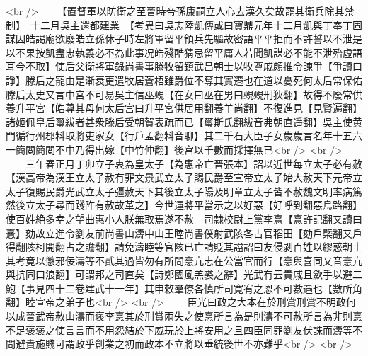 <br />
　　【置督軍以防衛之至晉時帝孫康嗣立人心去漢久矣故罷其衛兵除其禁制】　十二月吳主還都建業　【考異曰吳志陸凱傳或曰寶鼎元年十二月凱與丁奉丁固謀因皓謁廟欲廢皓立孫休子時左將軍留平領兵先驅故密語平平拒而不許誓以不泄是以不果按凱盡忠執義必不為此事况皓殘酷猜忌留平庸人若聞凱謀必不能不泄殆虛語耳今不取】使后父衛將軍錄尚書事滕牧留鎮武昌朝士以牧尊戚頗推令諫爭【爭讀曰諍】滕后之寵由是漸衰更遣牧居蒼梧雖爵位不奪其實遷也在道以憂死何太后常保佑滕后太史又言中宮不可易吳主信巫覡【在女曰巫在男曰覡覡刑狄翻】故得不廢常供養升平宮【皓尊其母何太后宫曰升平宮供居用翻養羊尚翻】不復進見【見賢遍翻】諸姬佩皇后璽紱者甚衆滕后受朝賀表疏而已【璽斯氏翻紱音弗朝直遥翻】吳主使黄門徧行州郡料取將吏家女【行戶孟翻料音聊】其二千石大臣子女歲歲言名年十五六一簡閲簡閲不中乃得出嫁【中竹仲翻】後宫以千數而採擇無已<br />
<br />
　　三年春正月丁卯立子衷為皇太子【為惠帝亡晉張本】詔以近世每立太子必有赦【漢高帝為漢王立太子赦有罪文景武立太子賜民爵至宣帝立太子始大赦天下元帝立太子復賜民爵光武立太子彊赦天下其後立太子陽及明章立太子皆不赦魏文明率病篤然後立太子尋而踐阼有赦故革之】今世運將平當示之以好惡【好呼到翻惡烏路翻】使百姓絶多幸之望曲惠小人朕無取焉遂不赦　司隸校尉上黨李憙【憙許記翻又讀曰憙】劾故立進令劉友前尚書山濤中山王睦尚書僕射武陔各占官稻田【劾戶槩翻又戶得翻陔柯開翻占之贍翻】請免濤睦等官陔已亡請貶其謚詔曰友侵剥百姓以繆惑朝士其考竟以懲邪佞濤等不貳其過皆勿有所問憙亢志在公當官而行【憙與喜同又音憙亢與抗同口浪翻】可謂邦之司直矣【詩鄭國風羔裘之辭】光武有云貴戚且歛手以避二鮑【事見四十二卷建武十一年】其申敕羣僚各慎所司寛宥之恩不可數遇也【數所角翻】睦宣帝之弟子也<br />
<br />
　　臣光曰政之大本在於刑賞刑賞不明政何以成晉武帝赦山濤而褒李憙其於刑賞兩失之使憙所言為是則濤不可赦所言為非則憙不足褒褒之使言言而不用怨結於下威玩於上將安用之且四臣同罪劉友伏誅而濤等不問避貴施賤可謂政乎創業之初而政本不立將以垂統後世不亦難乎<br />
<br />
